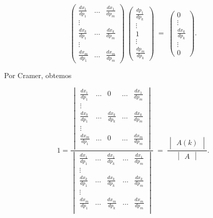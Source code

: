 \documentclass[
	12pt,				%
	openright,			%
	twoside,			%
	a4paper,			%
	english,			%
	french,				%
	spanish,			%
	brazil				%
	]{abntex2}
\begin{document}
\begin{equation} \label{matrizimperf}
	\begin{pmatrix}
		\frac{dx_1}{dp_1} & \ldots & \frac{dx_1}{dp_m} \\
		\vdots \\
		\frac{dx_k}{dp_1} & \ldots & \frac{dx_k}{dp_m} \\
		\vdots \\
		\frac{dx_m}{dp_1} & \ldots & \frac{dx_m}{dp_m}
	\end{pmatrix} \:
	\begin{pmatrix}
		\frac{dp_1}{dp_k} \\
		\vdots \\
		1 \\
		\vdots \\
		\frac{dp_m}{dp_k}
	\end{pmatrix} \; = \;
	\begin{pmatrix}
		0 \\
		\vdots \\
		\frac{dx_k}{dp_k} \\
		\vdots \\
		0
	\end{pmatrix}
	.
\end{equation}

Por Cramer, obtemos

\begin{equation} \label{cramerimperf}
	1 =
	\frac{\begin{vmatrix}
		\frac{dx_1}{dp_1} & \ldots & 0 & \ldots & \frac{dx_1}{dp_m} \\
		\vdots \\
		\frac{dx_k}{dp_1} & \ldots & \frac{dx_k}{dp_k} & \ldots & \frac{dx_k}{dp_m} \\
		\vdots \\
		\frac{dx_m}{dp_1} & \ldots & 0 & \ldots & \frac{dx_m}{dp_m} \\
	\end{vmatrix}}
	{\begin{vmatrix}
		\frac{dx_1}{dp_1} & \ldots & \frac{dx_1}{dp_k} & \ldots & \frac{dx_1}{dp_m} \\
		\vdots \\
		\frac{dx_k}{dp_1} & \ldots & \frac{dx_k}{dp_k} & \ldots & \frac{dx_k}{dp_m} \\
		\vdots \\
		\frac{dx_m}{dp_1} & \ldots & \frac{dx_m}{dp_k} & \ldots & \frac{dx_m}{dp_m} \\
	\end{vmatrix}} \; = \;
   \frac{
	\begin{vmatrix}
		A(k)
	\end{vmatrix}}
	{\begin{vmatrix}
		A
	\end{vmatrix}}.
\end{equation}
\end{document}
